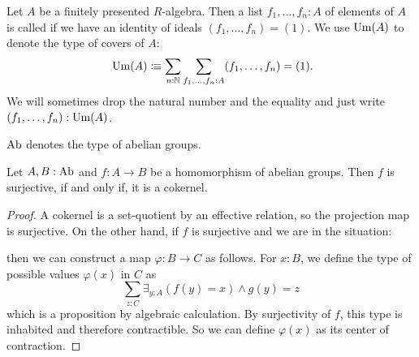 \begin{definition}
  \label{unimodular}
  Let $A$ be a finitely presented $R$-algebra.
  Then a list $f_1,\dots,f_n:A$ of elements of $A$ is called 
  if we have an identity of ideals $(f_1,\dots,f_n)=(1)$.
  We use $\mathrm{Um}(A)$ to denote the type of covers of $A$:
  \[
    \Um(A)\colonequiv \sum_{n:\N}\sum_{f_1,\dots,f_n:A} (f_1,\dots,f_n)=(1)
    \rlap{.}
  \]
  We will sometimes drop the natural number and the equality and just write $(f_1,\dots,f_n):\mathrm{Um}(A)$.
\end{definition}

\begin{definition}
  $\AbGroup$\index{$\AbGroup$} denotes the type of abelian groups.
\end{definition}

\begin{lemma}%
  \label{surjective-abgroup-hom-is-cokernel}
  Let $A,B:\operatorname{Ab}$ and $f:A\to B$ be a homomorphism of abelian groups.
  Then $f$ is surjective, if and only if, it is a cokernel.
\end{lemma}

\begin{proof}
  A cokernel is a set-quotient by an effective relation,
  so the projection map is surjective.
  On the other hand, if $f$ is surjective and we are in the situation:
  \begin{center}
  \end{center}
  then we can construct a map $\varphi:B\to C$ as follows.
  For $x:B$, we define the type of possible values $\varphi(x)$ in $C$ as
  \[
    \sum_{z:C}\exists_{y:A}(f(y)=x) \wedge g(y)=z
  \]
  which is a proposition by algebraic calculation.
  By surjectivity of $f$, this type is inhabited and therefore contractible.
  So we can define $\varphi(x)$ as its center of contraction.
\end{proof}

